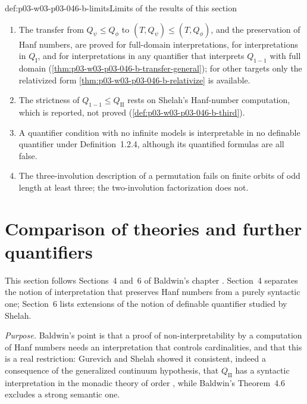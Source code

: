 \begin{hbwarning}{def:p03-w03-p03-046-b-limits}{Limits of the results of this section}
\begin{enumerate}
  \item The transfer from \(Q_\psi\le Q_\phi\) to
        \((T,Q_\psi)\le(T,Q_\phi)\), and the preservation of Hanf numbers,
        are proved for full-domain interpretations, for interpretations in
        \(Q_{\mathrm I}\), and for interpretations in any quantifier that
        interprets \(Q_{1-1}\) with full domain
        (\cref{thm:p03-w03-p03-046-b-transfer-general}); for other targets
        only the relativized form \cref{thm:p03-w03-p03-046-b-relativize} is
        available.
  \item The strictness of \(Q_{1-1}\le Q_{\mathrm{II}}\) rests on Shelah's
        Hanf-number computation, which is reported, not proved
        (\cref{def:p03-w03-p03-046-b-third}).
  \item A quantifier condition with no infinite models is interpretable in
        no definable quantifier under Definition~1.2.4, although its
        quantified formulas are all false.
  \item The three-involution description of a permutation fails on finite
        orbits of odd length at least three; the two-involution
        factorization does not.
\end{enumerate}
\end{hbwarning}

\section{Comparison of theories and further quantifiers}
\label{sec:p03-w03-p03-046-b-comparison}

This section follows Sections~4 and~6 of Baldwin's chapter
\cite[pp.~470--472, 476--477]{Baldwin1985DSOQ}. Section~4 separates the
notion of interpretation that preserves Hanf numbers from a purely
syntactic one; Section~6 lists extensions of the notion of definable
quantifier studied by Shelah.

\emph{Purpose.} Baldwin's point is that a proof of non-interpretability by
a computation of Hanf numbers needs an interpretation that controls
cardinalities, and that this is a real restriction: Gurevich and Shelah
showed it consistent, indeed a consequence of the generalized continuum
hypothesis, that \(Q_{\mathrm{II}}\) has a syntactic interpretation in the
monadic theory of order \cite[p.~470]{Baldwin1985DSOQ}, while Baldwin's
Theorem~4.6 excludes a strong semantic one.

